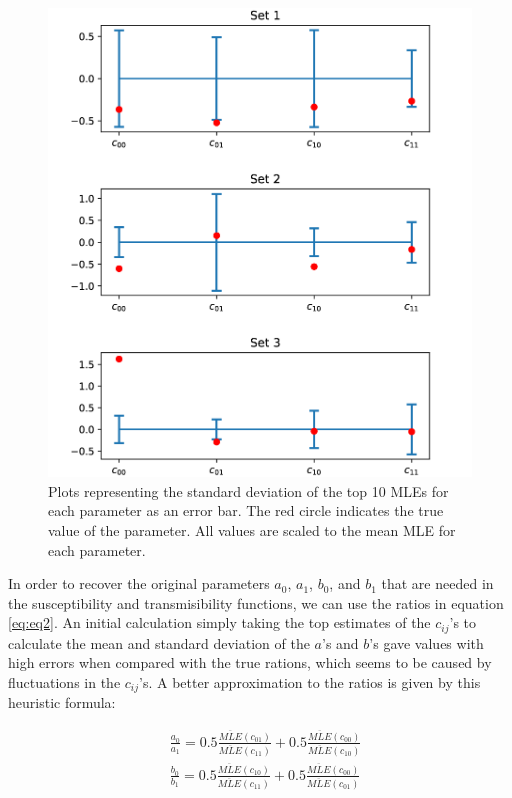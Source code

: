 \documentclass{article}
\begin{document}
\begin{figure} %
  \centering
  \includegraphics[scale=0.5]{Figure-3.png}
  \caption{Plots representing the standard deviation of the top 10 MLEs for each parameter as an error bar. The red circle indicates the true value of the parameter. All values are scaled to the mean MLE for each parameter.}
  \label{fig:fig3}
\end{figure}

In order to recover the original parameters $a_0$, $a_1$, $b_0$, and $b_1$ that are needed in the susceptibility and transmisibility functions, we can use the ratios in equation \ref{eq:eq2}. An initial calculation simply taking the top estimates of the $c_{ij}$'s to calculate the mean and standard deviation of the $a$'s and $b$'s gave values with high errors when compared with the true rations, which seems to be caused by fluctuations in the $c_{ij}$'s. A better approximation to the ratios is given by this heuristic formula:

\begin{equation}
\begin{aligned}
& \frac{a_0}{a_1}=0.5\frac{\overline{MLE}(c_{01})}{\overline{MLE}(c_{11})} + 0.5\frac{\overline{MLE}(c_{00})}{\overline{MLE}(c_{10})} \\
& \frac{b_0}{b_1}=0.5\frac{\overline{MLE}(c_{10})}{\overline{MLE}(c_{11})} + 0.5\frac{\overline{MLE}(c_{00})}{\overline{MLE}(c_{01})}
\end{aligned}
\label{eq:eq3}
\end{equation}
\end{document}
